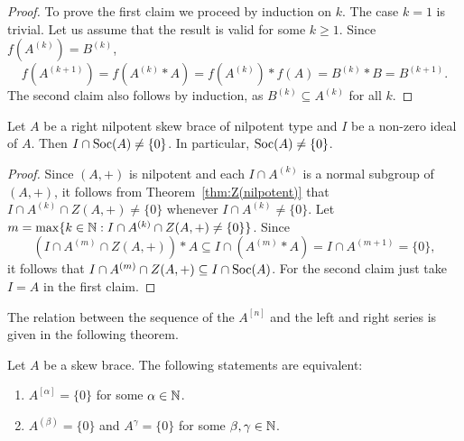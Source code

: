 \begin{proof}
    To prove the first claim we proceed by induction on $k$. 
    The case $k=1$ is trivial. Let us assume that the result 
    is valid for some $k\geq1$. Since
    $f(A^{(k)})=B^{(k)}$,
    \[
    f(A^{(k+1)})=f(A^{(k)}*A)=f(A^{(k)})*f(A)=B^{(k)}*B=B^{(k+1)}.
    \]
    The second claim also follows by induction, as $B^{(k)}\subseteq A^{(k)}$ for all $k$. 
\end{proof}

\begin{theorem}
    \label{thm:IcapSoc}
    Let $A$ be a right nilpotent skew brace of nilpotent type
    and $I$ be a non-zero ideal of $A$. Then $I\cap\operatorname{Soc}(A)\ne\{0\}$. 
    In particular,  $\operatorname{Soc}(A)\ne\{0\}$.
\end{theorem}

\begin{proof}
    Since $(A,+)$ is nilpotent and each $I\cap A^{(k)}$ is a normal subgroup of $(A,+)$, it follows
    from Theorem~\ref{thm:Z(nilpotent)} that $I\cap A^{(k)}\cap Z(A,+)\ne\{0\}$ whenever
    $I\cap A^{(k)}\ne\{0\}$.
    Let
    $m=\max\{k\in\mathbb{N}:I\cap A^{(k)}\cap Z(A,+)\ne \{0\}\}$.
    Since
    \[
        (I\cap A^{(m)}\cap Z(A,+))*A\subseteq I\cap (A^{(m)}*A)=I\cap A^{(m+1)}=\{0\},
    \]
    it follows that $I\cap A^{(m)}\cap Z(A,+)\subseteq I\cap \operatorname{Soc}(A)$. 
    For the second claim just take $I=A$ in the first claim. 
\end{proof}

The relation between the sequence of the $A^{[n]}$ and the left and
right series is given in the following theorem.

\begin{theorem}
    \label{thm:equivalence}
    Let $A$ be a skew brace. The following statements are equivalent:
    \begin{enumerate}
        \item $A^{[\alpha]}=\{0\}$ for some $\alpha\in\mathbb{N}$.
        \item $A^{(\beta)}=\{0\}$ and $A^\gamma=\{0\}$ for some $\beta,\gamma\in\mathbb{N}$.
    \end{enumerate}
\end{theorem}

